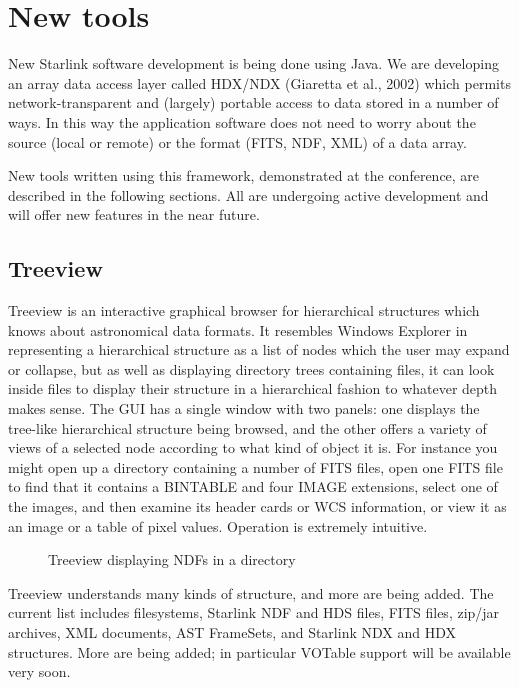 \section{New tools}

New Starlink software development is being done using Java.
We are developing an array data access layer called HDX/NDX
(Giaretta et al., 2002)
which permits network-transparent and (largely) portable 
access to data stored in a number of ways.  In this way the 
application software does not need to worry about the source
(local or remote) or the format (FITS, NDF, XML) of a data array.

New tools written using this framework, 
demonstrated at the conference, are described in the following sections.
All are undergoing active development and will offer new features
in the near future.

\subsection{Treeview}

Treeview is an interactive graphical browser for hierarchical structures
which knows about astronomical data formats.
It resembles Windows Explorer in representing a hierarchical structure
as a list of nodes which the user may expand or collapse, 
but as well as displaying directory trees
containing files, it can look inside files to display
their structure in a hierarchical fashion to whatever depth 
makes sense.  The GUI has a single window with two panels:
one displays the tree-like hierarchical structure being browsed,
and the other offers a variety of views of a selected node according
to what kind of object it is.  For instance you might open up a directory
containing a number of FITS files, open one FITS file to find that it
contains a BINTABLE and four IMAGE extensions, select one of the
images, and then examine its header cards or WCS information, 
or view it as an image or a table of pixel values.
Operation is extremely intuitive.
\begin{figure}
\caption{Treeview displaying NDFs in a directory}
\end{figure}

Treeview understands many kinds of structure, and more are being added.
The current list includes filesystems, Starlink NDF and HDS files, 
FITS files, zip/jar archives, XML documents, 
AST FrameSets, and Starlink NDX and HDX structures.
More are being added; in particular 
VOTable support will be available very soon.

